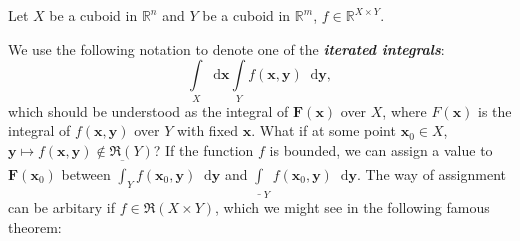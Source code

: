\documentclass[openany]{book}
\theoremstyle{plain}
\theoremstyle{definition}
\newcommand{\dif}{\mathop{}\!\mathrm{d}} %
\newcommand*{\bv}{\boldsymbol} %
\newcommand{\emphbf}[1]{\emph{\textbf{#1}}}
\begin{document}
Let $X$ be a cuboid in $\mathbb R^n$ and $Y$ be a cuboid in $\mathbb R^m$, $f \in \mathbb R^{X \times Y}$. 

We use the following notation to denote one of the \emphbf{iterated integrals}:
\begin{equation*}
	\int\limits_X \dif \bv x \int\limits_Y  f(\bv x, \bv y)  \dif \bv y, 
\end{equation*}
which should be understood as the integral of $\bv F(\bv x)$ over $X$, where $F(\bv x)$ is the integral of $f(\bv x, \bv y)$ over $Y$ with fixed $\bv x$. 
What if at some point $\bv x_0 \in X$, $\bv y \mapsto f(\bv x, \bv y) \notin \mathfrak R(Y)$? 
If the function $f$ is bounded, we can assign a value to $\bv F(\bv x_0)$ between $\overline{\int}_Y f(\bv x_0, \bv y) \dif \bv y$ and $\underline{\int}_Y f(\bv x_0, \bv y) \dif \bv y$. 
The way of assignment can be arbitary if $f \in \mathfrak R(X \times Y)$, which we might see in the following famous theorem:
\end{document}
